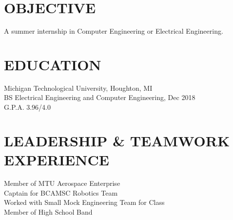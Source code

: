 \documentclass[letterpaper]{res}
\begin{document}
 


\address{\bf  PRESENT ADDRESS \\ 51280 Blue Top Cabin Rd \\ Houghton, MI 49931}
\address{\bf PERMANENT ADDRESS \\ 14200 Stone Jug Road \\  Battle Creek, MI 49015}

\begin{resume}

  \section{OBJECTIVE}          
  A summer internship in Computer Engineering or Electrical Engineering.          

  \section{EDUCATION}          
  Michigan Technological University, Houghton, MI  \\        
  BS Electrical Engineering and Computer Engineering, Dec 2018   \\      
  G.P.A. 3.96/4.0          

  \section{LEADERSHIP \& TEAMWORK EXPERIENCE}
  Member of MTU Aerospace Enterprise \\
  Captain for BCAMSC Robotics Team \\
  Worked with Small Mock Engineering Team for Class \\
  Member of High School Band




\end{resume}
\end{document}
